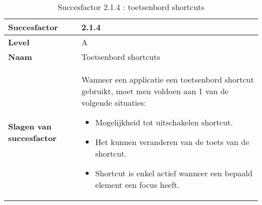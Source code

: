 \begin{table}[H]
    \centering
    \caption{Succesfactor 2.1.4 : toetsenbord shortcuts}
    \hspace*{-1cm}\begin{tabular}{|l|p{12cm}|} 
        \hline
        \textbf{Succesfactor}                 & 2.1.4                                                                                                                                                                                                                                                                                                                                                                                                                                                                                                             \\ 
        \hline
        \textbf{Level}                        & A                                                                                                                                                                                                                                                                                                                                                                                                                                                                                                                \\ 
        \hline
        \textbf{Naam}                         & Toetsenbord shortcuts ~                                                                                                                                                                                                                                                                                                                                                                                                                                                                                      \\ 
        \hline
        \textbf{Slagen van succesfactor}      & Wanneer een applicatie een toetsenbord shortcut gebruikt, moet men voldoen aan 1 van de volgende situaties: \begin{itemize}
            \item Mogelijkheid tot uitschakelen shortcut.
            \item Het kunnen veranderen van de toets van de shortcut.
            \item Shortcut is enkel actief wanneer een bepaald element een focus heeft.

\end{itemize}
\end{tabular}
\end{table}
